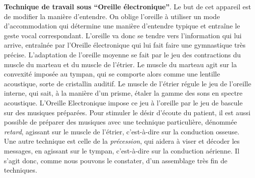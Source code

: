 \textbf{Technique de travail sous ``Oreille électronique''}.
Le but de cet appareil
est de modifier la manière d'entendre. On oblige l'oreille à utiliser
un mode d'accommodation qui
détermine une manière d'entendre typique et entraîne le geste
vocal correspondant.
L'oreille va donc se tendre
vers l'information qui lui arrive, entraînée par l'Oreille
électronique qui lui fait faire une
gymnastique très précise.
L'adaptation de l'oreille moyenne se fait par le jeu des contractions
du muscle du marteau et du muscle de l'étrier.
 Le muscle du marteau agit sur la convexité imposée au tympan, qui
se comporte alors comme une lentille acoustique, sorte de cristallin
auditif.
Le muscle de l'étrier régule le jeu de l'oreille interne, qui sait,
à la manière d'un prisme, étaler la gamme des sons en spectre acoustique.
L'Oreille Electronique impose ce jeu à l'oreille par le jeu de
bascule sur des musiques préparées.
Pour stimuler le désir d'écoute
du patient, il est aussi possible de préparer des musiques avec une
technique particulière, dénommée \emph{retard}, agissant sur le muscle de
l'étrier, c'est-à-dire sur la conduction osseuse. Une autre technique
est celle de la \emph{précession}, qui aidera à viser et décoder les messages,
en agissant sur le tympan, c'est-à-dire sur la conduction aérienne.
Il s'agit donc, comme nous pouvons le constater, d'un assemblage très
fin de techniques.

